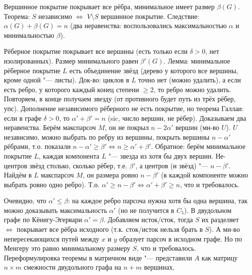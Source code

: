 	Вершинное покрытие покрывает все рёбра, минимальное имеет размер $\beta(G)$.
	Теорема: $S$ независимо $\iff$ $V\setminus S$ вершинное покрытие.
	Следствие: $\alpha(G)+\beta(G)=n$ (два неравенства: воспользовались максимальностью $\alpha$
	и минимальностью $\beta$).

	Рёберное покрытие покрывает все вершины (есть только если $\delta>0$, нет изолированных).
	Размер минимального равен $\beta'(G)$.
	Лемма: минимальное рёберное покрытие $L$ есть объединение звёзд (дерево у которого все вершины, кроме одной "--- листы).
	Док-во: циклов в $L$ точно нет (можно удалить), а если есть ребро, у которого каждый конец степени $\ge 2$, то ребро можно удалить.
	Повторяем, в конце получаем звезду (от противного будет путь из трёх рёбер, упс).
	Дополнение независимого рёберного не есть покрытие, но теорема Галлаи: если в графе $\delta>0$, то $\alpha'+\beta'=n$ (sic, число вершин, не рёбер).
	Доказываем два неравенства.
	Берём макспарсоч $M$, он не покрыл $n-2\alpha'$ вершин (мн-во $U$).
	$U$ независимо, можно выбрать по ребру из вершины, покрыть вершины $n-\alpha'$ рёбрами, т.о. показали $n-\alpha'\ge\beta' \iff n\ge\alpha'+\beta'$.
	Обратное: берём минимальное покрытие $L$, каждая компонента $L$ "--- звезда из хотя бы двух вершин.
	Не-центров звёзд столько, сколько рёбер, т.е. $\beta'$, а центров (и звёзд) "--- $n-\beta'$.
	Найдём в $L$ макспарсоч $M$, он размера ровно $n-\beta'$ (в каждой компоненте можно выбрать ровно одно ребро).
	Т.о. $\alpha' \ge n - \beta' \iff \alpha'+\beta' \ge n$, что и требовалось.

	Очевидно, что $\alpha' \le \beta$: на каждое ребро парсоча нужна хотя бы одна вершина, так можно доказывать максимальность $\alpha'$ (но не получится в $C_5$).
	В двудольном графе по Кёнигу-Эгервари $\alpha'=\beta$.
	Добавляем исток/сток, тогда $S$ их разделяет $\iff$ покрывает все рёбра исходного (т.к. сток/исток нельзя брать в $S$).
	А мн-во непересекающихся путей между $x$ и $y$ образует парсоч в исходном графе.
	Но по Менгеру это равно минимальному размеру $S$, что и требовалось.
	Переформулировка теоремы в матричном виде "--- представили $A$ как матрицу $n \times m$ смежности двудольного графа на $n+m$ вершинах,
